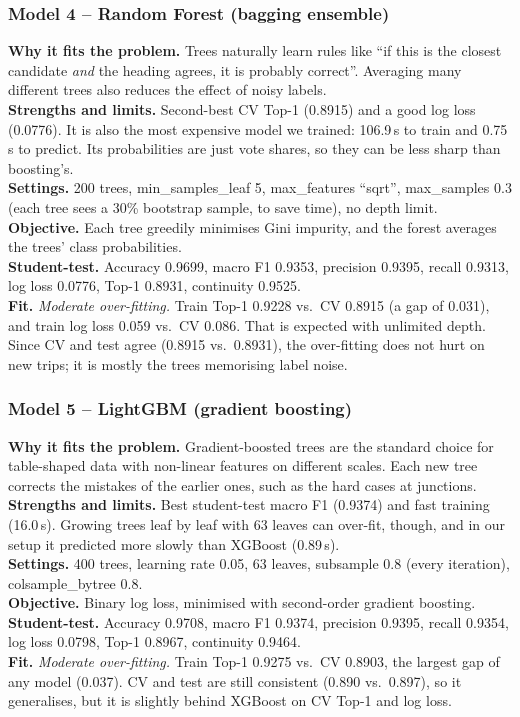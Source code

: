 \documentclass[11pt,a4paper]{article}
\begin{document}
\subsubsection*{Model 4 -- Random Forest (bagging ensemble)}
\textbf{Why it fits the problem.} Trees naturally learn rules like ``if this is the closest candidate
\emph{and} the heading agrees, it is probably correct''. Averaging many different trees also reduces the
effect of noisy labels.\\
\textbf{Strengths and limits.} Second-best CV Top-1 (0.8915) and a good log loss (0.0776). It is also the
most expensive model we trained: 106.9\,s to train and 0.75\,s to predict. Its probabilities are just vote
shares, so they can be less sharp than boosting's.\\
\textbf{Settings.} 200 trees, min\_samples\_leaf 5, max\_features ``sqrt'', max\_samples 0.3 (each tree sees a
30\% bootstrap sample, to save time), no depth limit.\\
\textbf{Objective.} Each tree greedily minimises Gini impurity, and the forest averages the trees' class
probabilities.\\
\textbf{Student-test.} Accuracy 0.9699, macro F1 0.9353, precision 0.9395, recall 0.9313, log loss 0.0776,
Top-1 0.8931, continuity 0.9525.\\
\textbf{Fit.} \emph{Moderate over-fitting.} Train Top-1 0.9228 vs.\ CV 0.8915 (a gap of 0.031), and train
log loss 0.059 vs.\ CV 0.086. That is expected with unlimited depth. Since CV and test agree (0.8915 vs.\
0.8931), the over-fitting does not hurt on new trips; it is mostly the trees memorising label noise.

\subsubsection*{Model 5 -- LightGBM (gradient boosting)}
\textbf{Why it fits the problem.} Gradient-boosted trees are the standard choice for table-shaped data with
non-linear features on different scales. Each new tree corrects the mistakes of the earlier ones, such as
the hard cases at junctions.\\
\textbf{Strengths and limits.} Best student-test macro F1 (0.9374) and fast training (16.0\,s). Growing trees
leaf by leaf with 63 leaves can over-fit, though, and in our setup it predicted more slowly than XGBoost
(0.89\,s).\\
\textbf{Settings.} 400 trees, learning rate 0.05, 63 leaves, subsample 0.8 (every iteration),
colsample\_bytree 0.8.\\
\textbf{Objective.} Binary log loss, minimised with second-order gradient boosting.\\
\textbf{Student-test.} Accuracy 0.9708, macro F1 0.9374, precision 0.9395, recall 0.9354, log loss 0.0798,
Top-1 0.8967, continuity 0.9464.\\
\textbf{Fit.} \emph{Moderate over-fitting.} Train Top-1 0.9275 vs.\ CV 0.8903, the largest gap of any model
(0.037). CV and test are still consistent (0.890 vs.\ 0.897), so it generalises, but it is slightly behind
XGBoost on CV Top-1 and log loss.
\end{document}
